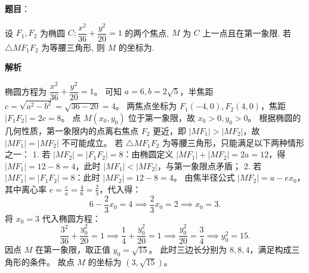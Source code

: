 \begin{answer}

\textbf{题目}：

设 $F_1, F_2$ 为椭圆 $C: \dfrac{x^2}{36} + \dfrac{y^2}{20} = 1$ 的两个焦点, $M$ 为 $C$ 上一点且在第一象限. 若 $\triangle MF_1F_2$ 为等腰三角形, 则 $M$ 的坐标为\gkblank{}.

\textbf{解析}

椭圆方程为 $\dfrac{x^2}{36} + \dfrac{y^2}{20} = 1$。
可知 $a = 6, b = 2\sqrt{5}$，半焦距 $c = \sqrt{a^2 - b^2} = \sqrt{36 - 20} = 4$。
两焦点坐标为 $F_1(-4, 0), F_2(4, 0)$，焦距 $|F_1F_2| = 2c = 8$。
点 $M(x_0, y_0)$ 位于第一象限，故 $x_0 > 0, y_0 > 0$。
根据椭圆的几何性质，第一象限内的点离右焦点 $F_2$ 更近，即 $|MF_1| > |MF_2|$，故 $|MF_1| = |MF_2|$ 不可能成立。
若 $\triangle MF_1F_2$ 为等腰三角形，只能满足以下两种情形之一：
1. 若 $|MF_2| = |F_1F_2| = 8$：由椭圆定义 $|MF_1| + |MF_2| = 2a = 12$，得 $|MF_1| = 12 - 8 = 4$，此时 $|MF_1| < |MF_2|$，与第一象限点矛盾；
2. 若 $|MF_1| = |F_1F_2| = 8$：此时 $|MF_2| = 12 - 8 = 4$。
由焦半径公式 $|MF_2| = a - ex_0$，其中离心率 $e = \frac{c}{a} = \frac{4}{6} = \frac{2}{3}$，代入得：
\nopagebreak[4]
\[6 - \frac{2}{3}x_0 = 4 \implies \frac{2}{3}x_0 = 2 \implies x_0 = 3.\]
将 $x_0 = 3$ 代入椭圆方程：
\nopagebreak[4]
\[\frac{3^2}{36} + \frac{y_0^2}{20} = 1 \implies \frac{1}{4} + \frac{y_0^2}{20} = 1 \implies \frac{y_0^2}{20} = \frac{3}{4} \implies y_0^2 = 15.\]
因点 $M$ 在第一象限，取正值 $y_0 = \sqrt{15}$。
此时三边长分别为 $8, 8, 4$，满足构成三角形的条件。
故点 $M$ 的坐标为 $(3, \sqrt{15})$。


\end{answer}
